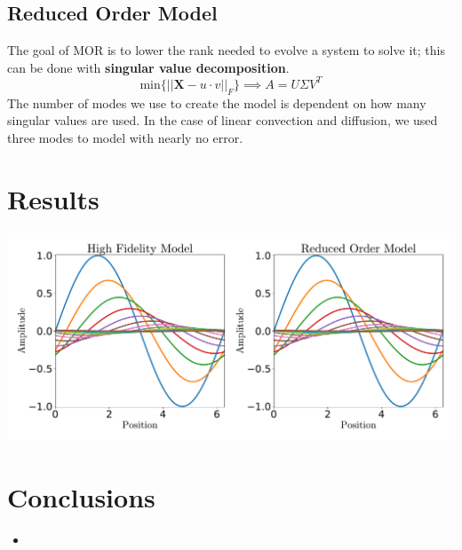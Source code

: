 \documentclass{a0poster}
\begin{document}
\begin{multicols}{3}
\subsection{Reduced Order Model}

The goal of MOR is to lower the rank needed to evolve a system to solve it; this can be done with \textbf{singular value decomposition}.
$$\mathrm{min} \{ ||\textbf{X} - u \cdot v||_F \} \implies A = U \Sigma V^T$$
The number of modes we use to create the model is dependent on how many singular values are used. In the case of linear convection and diffusion, we used three modes to model with nearly no error.


\section{Results}



\includegraphics[width=\linewidth]{fig.pdf}


\color{Navy} %

\section{Conclusions}

\begin{itemize}
\item 
\end{itemize}


\end{multicols}
\end{document}
